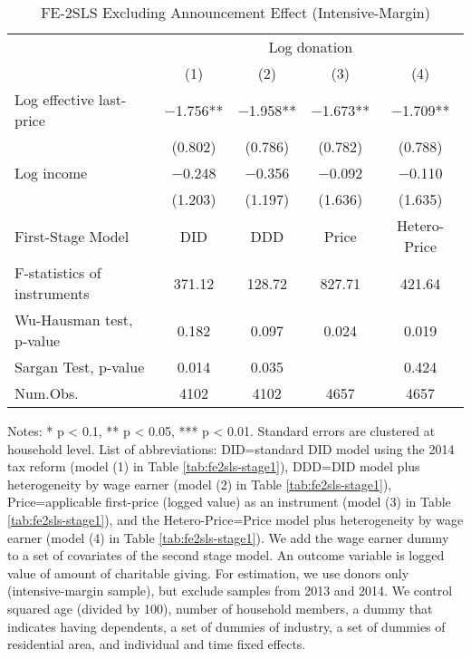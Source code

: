 \begin{table}

\caption{FE-2SLS Excluding Announcement Effect (Intensive-Margin) \label{tab:fe2sls-announce-int}}
\centering
\fontsize{8}{10}\selectfont
\begin{threeparttable}
\begin{tabular}[t]{lcccc}
\toprule
\multicolumn{1}{c}{ } & \multicolumn{4}{c}{Log donation} \\
\cmidrule(l{3pt}r{3pt}){2-5}
  & (1) & (2) & (3) & (4)\\
\midrule
Log effective last-price & \num{-1.756}** & \num{-1.958}** & \num{-1.673}** & \num{-1.709}**\\
 & (\num{0.802}) & (\num{0.786}) & (\num{0.782}) & (\num{0.788})\\
Log income & \num{-0.248} & \num{-0.356} & \num{-0.092} & \num{-0.110}\\
 & (\num{1.203}) & (\num{1.197}) & (\num{1.636}) & (\num{1.635})\\
\midrule
First-Stage Model & DID & DDD & Price & Hetero-Price\\
F-statistics of instruments & 371.12 & 128.72 & 827.71 & 421.64\\
Wu-Hausman test, p-value & 0.182 & 0.097 & 0.024 & 0.019\\
Sargan Test, p-value & 0.014 & 0.035 &  & 0.424\\
Num.Obs. & \num{4102} & \num{4102} & \num{4657} & \num{4657}\\
\bottomrule
\end{tabular}
\begin{tablenotes}
\item Notes: * p < 0.1, ** p < 0.05, *** p < 0.01. Standard errors are clustered at household level. List of abbreviations: DID=standard DID model using the 2014 tax reform (model (1) in Table \ref{tab:fe2sls-stage1}), DDD=DID model plus heterogeneity by wage earner (model (2) in Table \ref{tab:fe2sls-stage1}), Price=applicable first-price (logged value) as an instrument (model (3) in Table \ref{tab:fe2sls-stage1}), and the Hetero-Price=Price model plus heterogeneity by wage earner (model (4) in Table \ref{tab:fe2sls-stage1}). We add the wage earner dummy to a set of covariates of the second stage model. An outcome variable is logged value of amount of charitable giving. For estimation, we use donors only (intensive-margin sample), but exclude samples from 2013 and 2014. We control squared age (divided by 100), number of household members, a dummy that indicates having dependents, a set of dummies of industry, a set of dummies of residential area, and individual and time fixed effects.
\end{tablenotes}
\end{threeparttable}
\end{table}
